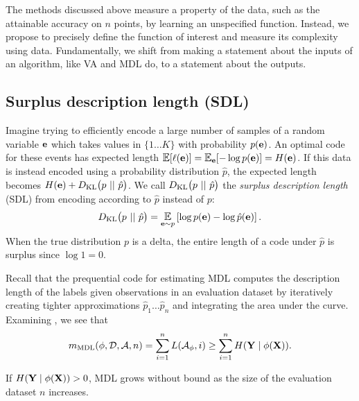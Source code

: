 The methods discussed above measure a property of the data, such as the attainable accuracy on $n$ points, by learning an unspecified function.
Instead, we propose to precisely define the function of interest and measure its complexity using data.
Fundamentally, we shift from making a statement about the inputs of an algorithm, like VA and MDL do, to a statement about the outputs.

\subsection{Surplus description length (SDL)}
Imagine trying to efficiently encode a large number of samples of a random variable ${\mathbf{e}}$ which takes values in $\{1 \ldots K\}$ with probability $p({\mathbf{e}})$.
An optimal code for these events has expected length $\E[\ell(\rve)] = \E_{\rve} [ - \log p(\rve)] = H(\rve)$.
If this data is instead encoded using a probability distribution $\hat p$, the expected length becomes $H({\mathbf{e}}) + D_{\mathrm{KL}} \bigl( p ~||~ \hat p \bigr)$.
We call $D_{\mathrm{KL}} \bigl( p ~||~ \hat p \bigr)$ the \emph{surplus description length} (SDL) from encoding according to $\hat p$ instead of $p$:
\begin{align}
    \KL{p}{\hat p}
    = \E_{\rve \sim p} \left[ \log p(\rve) - \log \hat p(\rve) \right].
\end{align}
When the true distribution $p$ is a delta, the entire length of a code under $\hat p$ is surplus since $\log 1 = 0$.

Recall that the prequential code for estimating MDL computes the description length of the labels given observations in an evaluation dataset by iteratively creating tighter approximations $\hat p_{1} \ldots \hat p_{n}$ and integrating the area under the curve.
Examining , we see that
\begin{align}
     m_{\mathrm{MDL}}(\phi, \mathcal{D}, \mathcal{A},n) = \sum_{i=1}^n L(\mathcal{A}_\phi, i) \geq \sum_{i=1}^n H({\mathbf{Y}} \mid \phi({\mathbf{X}})).
\end{align}

If $H({\mathbf{Y}} \mid \phi({\mathbf{X}})) > 0$, MDL grows without bound as the size of the evaluation dataset $n$ increases.

